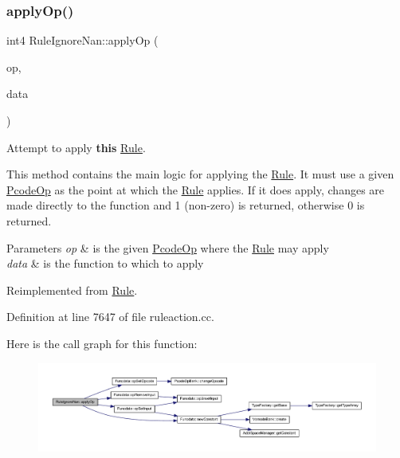 \subsubsection{\texorpdfstring{applyOp()}{applyOp()}}
{\footnotesize\ttfamily int4 Rule\+Ignore\+Nan\+::apply\+Op (\begin{DoxyParamCaption}\item[{\mbox{\hyperlink{class_pcode_op}{Pcode\+Op}} $\ast$}]{op,  }\item[{\mbox{\hyperlink{class_funcdata}{Funcdata}} \&}]{data }\end{DoxyParamCaption})\hspace{0.3cm}{\ttfamily [virtual]}}



Attempt to apply {\bfseries{this}} \mbox{\hyperlink{class_rule}{Rule}}. 

This method contains the main logic for applying the \mbox{\hyperlink{class_rule}{Rule}}. It must use a given \mbox{\hyperlink{class_pcode_op}{Pcode\+Op}} as the point at which the \mbox{\hyperlink{class_rule}{Rule}} applies. If it does apply, changes are made directly to the function and 1 (non-\/zero) is returned, otherwise 0 is returned. 
\begin{DoxyParams}{Parameters}
{\em op} & is the given \mbox{\hyperlink{class_pcode_op}{Pcode\+Op}} where the \mbox{\hyperlink{class_rule}{Rule}} may apply \\
\hline
{\em data} & is the function to which to apply \\
\hline
\end{DoxyParams}


Reimplemented from \mbox{\hyperlink{class_rule_a4e3e61f066670175009f60fb9dc60848}{Rule}}.



Definition at line 7647 of file ruleaction.\+cc.

Here is the call graph for this function\+:
\nopagebreak
\begin{figure}[H]
\begin{center}
\leavevmode
\includegraphics[width=350pt]{class_rule_ignore_nan_afd2b8e067067db3127664cd2cedfd092_cgraph}
\end{center}
\end{figure}
\mbox{\label{class_rule_ignore_nan_a6ab45fb568de88034a821f0679a5c91e}} 
